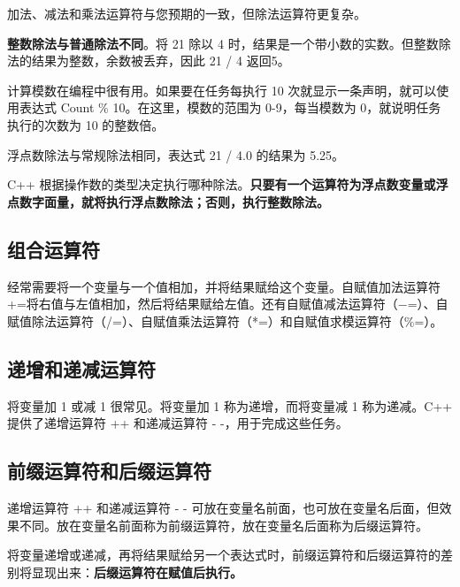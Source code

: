 加法、减法和乘法运算符与您预期的一致，但除法运算符更复杂。

\textbf{整数除法与普通除法不同}。将 21 除以 4 时，结果是一个带小数的实数。但整数除法的结果为整数，余数被丢弃，因此 21 / 4 返回5。

计算模数在编程中很有用。如果要在任务每执行 10 次就显示一条声明，就可以使用表达式 Count \% 10。在这里，模数的范围为 0-9，每当模数为 0，就说明任务执行的次数为 10 的整数倍。

浮点数除法与常规除法相同，表达式 21 / 4.0 的结果为 5.25。

C++ 根据操作数的类型决定执行哪种除法。\textbf{只要有一个运算符为浮点数变量或浮点数字面量，就将执行浮点数除法；否则，执行整数除法。}
\subsection*{组合运算符}
经常需要将一个变量与一个值相加，并将结果赋给这个变量。自赋值加法运算符+=将右值与左值相加，然后将结果赋给左值。还有自赋值减法运算符（−=）、自赋值除法运算符（/=）、自赋值乘法运算符（*=）和自赋值求模运算符（\%=）。

\subsection*{递增和递减运算符}
将变量加 1 或减 1 很常见。将变量加 1 称为递增，而将变量减 1 称为递减。C++ 提供了递增运算符 ++ 和递减运算符 - -，用于完成这些任务。
\subsection*{前缀运算符和后缀运算符}
递增运算符 ++ 和递减运算符 - - 可放在变量名前面，也可放在变量名后面，但效果不同。放在变量名前面称为前缀运算符，放在变量名后面称为后缀运算符。

将变量递增或递减，再将结果赋给另一个表达式时，前缀运算符和后缀运算符的差别将显现出来：\textbf{后缀运算符在赋值后执行。}
